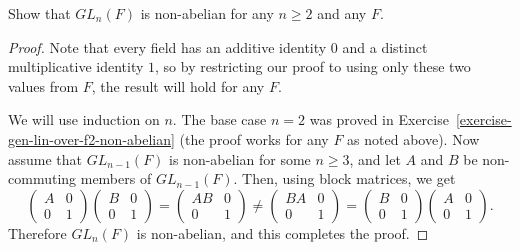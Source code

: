  Show that $GL_n(F)$ is non-abelian for any $n\geq2$ and any
$F$.
\begin{proof}
  Note that every field has an additive identity $0$ and a distinct
  multiplicative identity $1$, so by restricting our proof to using
  only these two values from $F$, the result will hold for any $F$.

  We will use induction on $n$. The base case $n = 2$ was proved in
  Exercise~\ref{exercise-gen-lin-over-f2-non-abelian} (the proof works
  for any $F$ as noted above). Now assume that $GL_{n-1}(F)$ is
  non-abelian for some $n\geq3$, and let $A$ and $B$ be non-commuting
  members of $GL_{n-1}(F)$. Then, using block matrices, we get
  \begin{equation*}
    \begin{pmatrix}
      A & 0 \\
      0 & 1
    \end{pmatrix}
    \begin{pmatrix}
      B & 0 \\
      0 & 1
    \end{pmatrix}
    =
    \begin{pmatrix}
      AB & 0 \\
      0 & 1
    \end{pmatrix}
    \neq
    \begin{pmatrix}
      BA & 0 \\
      0 & 1
    \end{pmatrix}
    =
    \begin{pmatrix}
      B & 0 \\
      0 & 1
    \end{pmatrix}
    \begin{pmatrix}
      A & 0 \\
      0 & 1
    \end{pmatrix}.
  \end{equation*}
  Therefore $GL_n(F)$ is non-abelian, and this completes the proof.
\end{proof}
